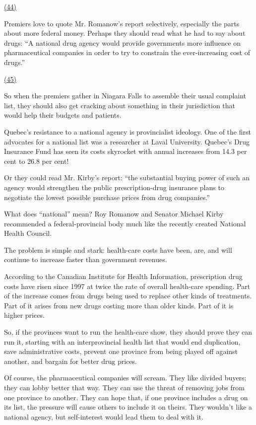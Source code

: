 \qquad \ul{(44) \qquad\qquad\qquad\qquad}

\qquad Premiers love to quote Mr. Romanow's report selectively, especially the parts about more federal money. Perhaps they should read what he had to say about drugs: ``A national drug agency would provide governments more influence on pharmaceutical companies in order to try to constrain the ever-increasing cost of drugs.''

\qquad \ul{(45) \qquad\qquad\qquad\qquad}

\qquad So when the premiers gather in Niagara Falls to assemble their usual complaint list, they should also get cracking about something in their jurisdiction that would help their budgets and patients.

\qquad [A] Quebec's resistance to a national agency is provincialist ideology. One of the first advocates for a national list was a researcher at Laval University. Quebec's Drug Insurance Fund has seen its costs skyrocket with annual increases from 14.3 per cent to 26.8 per cent!

\qquad [B] Or they could read Mr. Kirby's report: ``the substantial buying power of such an agency would strengthen the public prescription-drug insurance plans to negotiate the lowest possible purchase prices from drug companies.''

\qquad [C] What does ``national'' mean? Roy Romanow and Senator Michael Kirby recommended a federal-provincial body much like the recently created National Health Council.

\qquad [D] The problem is simple and stark: health-care costs have been, are, and will continue to increase faster than government revenues.

\qquad [E] According to the Canadian Institute for Health Information, prescription drug costs have risen since 1997 at twice the rate of overall health-care spending. Part of the increase comes from drugs being used to replace other kinds of treatments. Part of it arises from new drugs costing more than older kinds. Part of it is higher prices.

\qquad [F] So, if the provinces want to run the health-care show, they should prove they can run it, starting with an interprovincial health list that would end duplication, save administrative costs, prevent one province from being played off against another, and bargain for better drug prices.

\qquad [G] Of course, the pharmaceutical companies will scream. They like divided buyers; they can lobby better that way. They can use the threat of removing jobs from one province to another. They can hope that, if one province includes a drug on its list, the pressure will cause others to include it on theirs. They wouldn't like a national agency, but self-interest would lead them to deal with it.